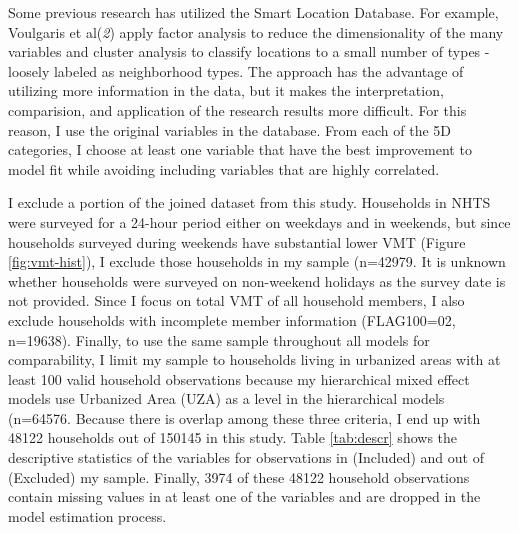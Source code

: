 \documentclass[numbered]{trbunofficial}
\begin{document}
Some previous research has utilized the Smart Location Database. For example, Voulgaris et al(\emph{2}) apply factor analysis to reduce the dimensionality of the many variables and cluster analysis to classify locations to a small number of types - loosely labeled as neighborhood types. The approach has the advantage of utilizing more information in the data, but it makes the interpretation, comparision, and application of the research results more difficult. For this reason, I use the original variables in the database. From each of the 5D categories, I choose at least one variable that have the best improvement to model fit while avoiding including variables that are highly correlated.

I exclude a portion of the joined dataset from this study. Households in NHTS were surveyed for a 24-hour period either on weekdays and in weekends, but since households surveyed during weekends have substantial lower VMT (Figure \ref{fig:vmt-hist}), I exclude those households in my sample (n=42979. It is unknown whether households were surveyed on non-weekend holidays as the survey date is not provided. Since I focus on total VMT of all household members, I also exclude households with incomplete member information (FLAG100=02, n=19638). Finally, to use the same sample throughout all models for comparability, I limit my sample to households living in urbanized areas with at least 100 valid household observations because my hierarchical mixed effect models use Urbanized Area (UZA) as a level in the hierarchical models (n=64576. Because there is overlap among these three criteria, I end up with 48122 households out of 150145 in this study. Table \ref{tab:descr} shows the descriptive statistics of the variables for observations in (Included) and out of (Excluded) my sample. Finally, 3974 of these 48122 household observations contain missing values in at least one of the variables and are dropped in the model estimation process.
\end{document}
